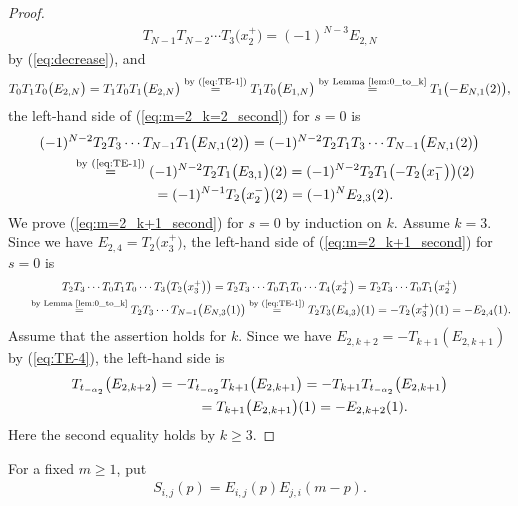 \documentclass[10pt,a4paper]{amsart}
\theoremstyle{definition}
\numberwithin{equation}{section}
\begin{document}
\begin{proof}
\begin{gather*}
T_{N-1} T_{N-2} \cdots T_3 \big(x_2^+\big) = (-1)^{N-3} E_{2,N}
\end{gather*}
by (\ref{eq:decrease}), and
\begin{gather*}
T_0 T_1 T_0 \big(E_{2,N}\big) = T_1 T_0 T_1 \big(E_{2,N}\big) \overset{\text{by (\ref{eq:TE-1})}}{=} T_1 T_0 \big(E_{1,N}\big)
\overset{\text{by Lemma~\ref{lem:0_to_k}}}{=} T_1\big({-}E_{N,1}(2)\big),
\end{gather*}
the left-hand side of (\ref{eq:m=2_k=2_second}) for $s=0$ is
\begin{gather*}
(-1)^{N-2} T_2 T_3 \cdots T_{N-1} T_1 \big(E_{N,1}(2)\big) = (-1)^{N-2} T_2 T_1 T_3 \cdots T_{N-1} \big(E_{N,1}(2)\big) \\
\qquad{} \overset{\text{by (\ref{eq:TE-1})}}{=} (-1)^{N-2} T_2 T_1 \big(E_{3,1}\big) (2)= (-1)^{N-2} T_2 T_1 \big({-}T_2\big(x_1^-\big)\big)(2) \\
\qquad {} = (-1)^{N-1} T_2 \big(x_2^-\big)(2) = (-1)^N E_{2,3}(2).
\end{gather*}
We prove (\ref{eq:m=2_k+1_second}) for $s=0$ by induction on $k$. Assume $k=3$. Since we have $E_{2,4}=T_2\big(x_3^+\big)$, the left-hand side of (\ref{eq:m=2_k+1_second}) for $s=0$ is
\begin{gather*}
T_2 T_3 \cdots T_0 T_1 T_0 \cdots T_3\big(T_2\big(x_3^+\big)\big) = T_2 T_3 \cdots T_0 T_1 T_0 \cdots T_{4} \big(x_{2}^+\big) = T_2 T_3 \cdots T_0 T_1 \big(x_2^+\big) \\
\qquad \overset{\text{by Lemma~\ref{lem:0_to_k}}}{=} T_2 T_3 \cdots T_{N-1} \big(E_{N,3}(1)\big)\overset{\text{by (\ref{eq:TE-1})} }{=} T_2 T_3 (E_{4,3}) (1) = - T_2\big(x_3^+\big)(1) = -E_{2,4}(1).
\end{gather*}
Assume that the assertion holds for $k$.
Since we have $E_{2,k+2} = -T_{k+1}(E_{2,k+1})$ by (\ref{eq:TE-4}), the left-hand side is
\begin{gather*}
T_{t_{-\alpha_2}}\big(E_{2,k+2}\big) = -T_{t_{-\alpha_2}} T_{k+1}\big(E_{2,k+1}\big) = -T_{k+1} T_{t_{-\alpha_2}}\big(E_{2,k+1}\big)\\
\hphantom{T_{t_{-\alpha_2}}\big(E_{2,k+2}\big)}{} = T_{k+1} \big(E_{2,k+1}\big)(1) = -E_{2,k+2}(1).
\end{gather*}
Here the second equality holds by $k \geq 3$.
\end{proof}

For a fixed $m \geq 1$, put
\begin{gather*}
S_{i,j}(p) = E_{i,j}(p)E_{j,i}(m-p).
\end{gather*}
\end{document}
